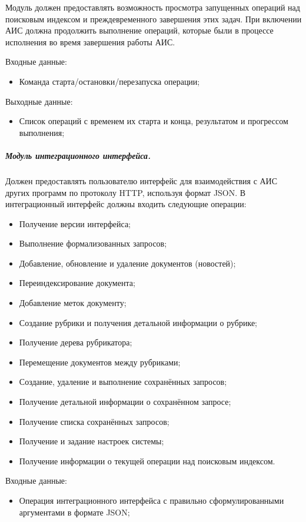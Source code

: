 Модуль должен предоставлять возможность просмотра запущенных операций над поисковым индексом и преждевременного завершения этих задач. При включении АИС должна продолжить выполнение операций, которые были в процессе исполнения во время завершения работы АИС.

Входные данные:
\begin{itemize}
\item Команда старта/остановки/перезапуска операции;
\end{itemize}

Выходные данные:
\begin{itemize}
\item Список операций с временем их старта и конца, результатом и прогрессом выполнения;
\end{itemize}

\subparagraph{Модуль интеграционного интерфейса.} \hfill

Должен предоставлять пользователю интерфейс для взаимодействия с АИС других программ по протоколу HTTP, используя формат JSON. В интеграционный интерфейс должны входить следующие операции:
\begin{itemize}
\item Получение версии интерфейса;
\item Выполнение формализованных запросов;
\item Добавление, обновление и удаление документов (новостей);
\item Переиндексирование документа;
\item Добавление меток документу;
\item Создание рубрики и получения детальной информации о рубрике;
\item Получение дерева рубрикатора;
\item Перемещение документов между рубриками;
\item Создание, удаление и выполнение сохранённых запросов;
\item Получение детальной информации о сохранённом запросе;
\item Получение списка сохранённых запросов;
\item Получение и задание настроек системы;
\item Получение информации о текущей операции над поисковым индексом.
\end{itemize}

Входные данные:
\begin{itemize}
\item Операция интеграционного интерфейса с правильно сформулированными аргументами в формате JSON;
\end{itemize}

